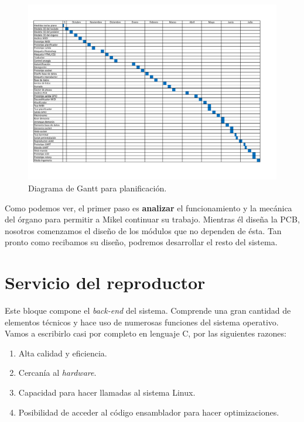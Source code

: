 \smallskip

\begin{figure}[H]
	\noindent \begin{centering}
		\includegraphics[clip=true,trim= 50 50 50 50,width=\linewidth]{capitulo5/gantt}
		\par\end{centering}
	\smallskip
	\caption{\label{fig:gantt} Diagrama de Gantt para planificación.}
\end{figure} 

\smallskip

Como podemos ver, el primer paso es \textbf{analizar} el funcionamiento y la mecánica del órgano para permitir a Mikel continuar su trabajo. Mientras él diseña la \acrshort{PCB}, nosotros comenzamos el diseño de los módulos que no dependen de ésta. Tan pronto como recibamos su diseño, podremos desarrollar el resto del sistema.

\section{Servicio del reproductor}

Este bloque compone el \textit{back-end} del sistema. Comprende una gran cantidad de elementos técnicos y hace uso de numerosas funciones del sistema operativo. Vamos a escribirlo casi por completo en lenguaje C, por las siguientes razones:

\begin{enumerate}
	\item Alta calidad y eficiencia.
	\item Cercanía al \textit{hardware}.
	\item Capacidad para hacer llamadas al sistema Linux.
	\item Posibilidad de acceder al código ensamblador para hacer optimizaciones.
\end{enumerate}

